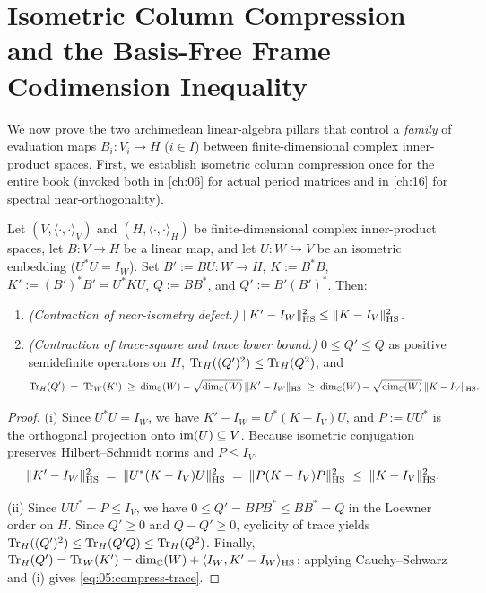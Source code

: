 \section{Isometric Column Compression and the Basis-Free Frame Codimension Inequality}
\label{sec:05:frame-engine}

We now prove the two archimedean linear-algebra pillars that control a \emph{family} of evaluation maps $B_i : V_i \to H$ ($i \in I$) between finite-dimensional complex inner-product spaces. First, we establish isometric column compression once for the entire book (invoked both in \cref{ch:06} for actual period matrices and in \cref{ch:16} for spectral near-orthogonality).

\begin{proposition}
\label{prop:05:isometric-compression}
Let $(V, \langle \cdot, \cdot \rangle_V)$ and $(H, \langle \cdot, \cdot \rangle_H)$ be finite-dimensional complex inner-product spaces, let $B : V \to H$ be a linear map, and let $U : W \hookrightarrow V$ be an isometric embedding ($U^* U = I_W$). Set $B' := B U : W \to H$, $K := B^* B$, $K' := (B')^* B' = U^* K U$, $Q := B B^*$, and $Q' := B' (B')^*$. Then:
\begin{enumerate}[label=\textup{(\roman*)}]
\item \emph{(Contraction of near-isometry defect.)} $\|K' - I_W\|_{\mathrm{HS}}^2 \le \|K - I_V\|_{\mathrm{HS}}^2$.
\item \emph{(Contraction of trace-square and trace lower bound.)} $0 \le Q' \le Q$ as positive semidefinite operators on $H$, $\operatorname{Tr}_H((Q')^2) \le \operatorname{Tr}_H(Q^2)$, and
  \begin{equation}
  \label{eq:05:compress-trace}
    \operatorname{Tr}_H(Q') \;=\; \operatorname{Tr}_W(K') \;\ge\; \dim_{\mathbb{C}}(W) - \sqrt{\dim_{\mathbb{C}}(W)}\,\|K' - I_W\|_{\mathrm{HS}}
    \;\ge\; \dim_{\mathbb{C}}(W) - \sqrt{\dim_{\mathbb{C}}(W)}\,\|K - I_V\|_{\mathrm{HS}}.
  \end{equation}
\end{enumerate}
\end{proposition}

\begin{proof}
(i) Since $U^* U = I_W$, we have $K' - I_W = U^*(K - I_V)U$, and $P := U U^*$ is the orthogonal projection onto $\operatorname{im}(U) \subseteq V$. Because isometric conjugation preserves Hilbert--Schmidt norms and $P \le I_V$,
\[
  \|K' - I_W\|_{\mathrm{HS}}^2 \;=\; \|U^*(K - I_V)U\|_{\mathrm{HS}}^2 \;=\; \|P(K - I_V)P\|_{\mathrm{HS}}^2 \;\le\; \|K - I_V\|_{\mathrm{HS}}^2.
\]

(ii) Since $U U^* = P \le I_V$, we have $0 \le Q' = B P B^* \le B B^* = Q$ in the Loewner order on $H$. Since $Q' \ge 0$ and $Q - Q' \ge 0$, cyclicity of trace yields $\operatorname{Tr}_H((Q')^2) \le \operatorname{Tr}_H(Q' Q) \le \operatorname{Tr}_H(Q^2)$. Finally, $\operatorname{Tr}_H(Q') = \operatorname{Tr}_W(K') = \dim_{\mathbb{C}}(W) + \langle I_W, K' - I_W \rangle_{\mathrm{HS}}$; applying Cauchy--Schwarz and (i) gives \eqref{eq:05:compress-trace}.
\end{proof}

